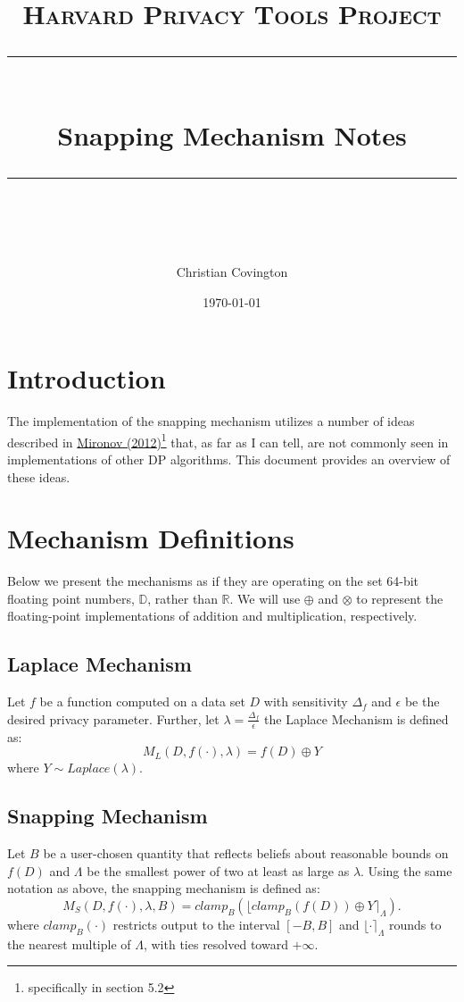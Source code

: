 \documentclass[11pt]{scrartcl} %
\title{
	\normalfont\normalsize
	\textsc{Harvard Privacy Tools Project}\\ %
	\vspace{25pt} %
	\rule{\linewidth}{0.5pt}\\ %
	\vspace{20pt} %
	{\huge Snapping Mechanism Notes}\\ %
	\vspace{12pt} %
	\rule{\linewidth}{2pt}\\ %
	\vspace{12pt} %
}
\author{\LARGE Christian Covington} %
\date{\normalsize\today} %
\begin{document}
\maketitle %

\section{Introduction}
The implementation of the snapping mechanism utilizes a number of ideas described in \href{http://citeseerx.ist.psu.edu/viewdoc/download?doi=10.1.1.366.5957&rep=rep1&type=pdf}{Mironov (2012)}\footnote{specifically in section 5.2} that, as far as I can tell, are not commonly seen in implementations of other DP algorithms. This document provides an overview of these ideas. \newline

\section{Mechanism Definitions}
Below we present the mechanisms as if they are operating on the set 64-bit floating point numbers, $\mathbb{D}$, rather than $\mathbb{R}$. We will use $\oplus$ and $\otimes$ to represent the floating-point implementations of addition and multiplication, respectively.

\subsection{Laplace Mechanism}
Let $f$ be a function computed on a data set $D$ with sensitivity $\Delta_f$ and $\epsilon$ be the desired privacy parameter. Further, let $\lambda = \frac{\Delta_f}{\epsilon}$ the Laplace Mechanism is defined as:
\[ M_{L}(D, f(\cdot), \lambda) = f(D) \oplus Y \]
where $Y \sim Laplace(\lambda)$.

\subsection{Snapping Mechanism}
Let $B$ be a user-chosen quantity that reflects beliefs about reasonable bounds on $f(D)$ and $\Lambda$ be the smallest power of two at least as large as $\lambda$. Using the same notation as above, the snapping mechanism is defined as:
\[ M_{S}(D, f(\cdot), \lambda, B) = clamp_{B}\left( \lfloor clamp_{B}\left( f(D) \right) \oplus Y \rceil_{\Lambda} \right). \]
where $clamp_{B}(\cdot)$ restricts output to the interval $[-B, B]$ and $\lfloor \cdot \rceil_{\Lambda}$ rounds to the nearest multiple of $\Lambda$, with ties resolved toward $+ \infty$.
\end{document}
